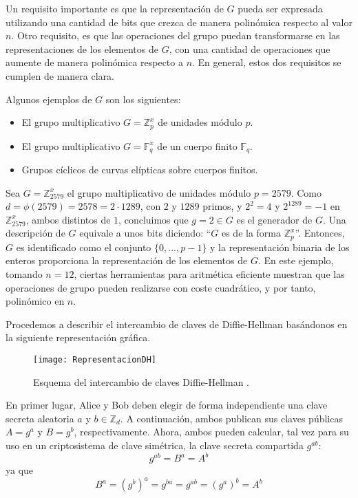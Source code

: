     Un requisito importante es que la representación de $G$ pueda ser expresada utilizando una cantidad de bits que crezca de manera polinómica respecto al valor $n$. Otro requisito, es que las operaciones del grupo puedan transformarse en las representaciones de los elementos de $G$, con una cantidad de operaciones que aumente de manera polinómica respecto a $n$. En general, estos dos requisitos se cumplen de manera clara.

    Algunos ejemplos de $G$ son los siguientes:
    \begin{itemize}
        \item El grupo multiplicativo $G = \mathbb{Z}_{p}^{x}$ de unidades módulo $p$.
        \item El grupo multiplicativo $G = \mathbb{F}_{q}^{x}$ de un cuerpo finito $\mathbb{F}_{q}$.
        \item Grupos cíclicos de curvas elípticas sobre cuerpos finitos.
    \end{itemize}
    
    \begin{ejemplo} \cite{cryptoSchool}
        Sea $G = \mathbb{Z}_{2579}^{x}$ el grupo multiplicativo de unidades módulo $p = 2579$. Como $d = \phi(2579) = 2578 = 2 \cdot 1289$, con $2$ y $1289$ primos, y $2^{2} = 4$ y $2^{1289} = -1$ en $\mathbb{Z}_{2579}^{x}$, ambos distintos de $1$, concluimos que $g = 2 \in G$ es el generador de $G$. Una descripción de $G$ equivale a unos bits diciendo: ``$G$ es de la forma $\mathbb{Z}_{p}^{x}$''. Entonces, $G$ es identificado como el conjunto $\{0, ... , p-1\}$ y la representación binaria de los enteros proporciona la representación de los elementos de $G$. En este ejemplo, tomando $n = 12$, ciertas herramientas para aritmética eficiente muestran que las operaciones de grupo pueden realizarse con coste cuadrático, y por tanto, polinómico en $n$.
    \end{ejemplo}

    Procedemos a describir el intercambio de claves de Diffie-Hellman basándonos en la siguiente representación gráfica.
    
    \begin{figure}[H]
        \centering
        \texttt{[image: RepresentacionDH]}
        \caption{Esquema del intercambio de claves Diffie-Hellman \cite{cryptoSchool}.}
    \end{figure}

    En primer lugar, Alice y Bob deben elegir de forma independiente una clave secreta aleatoria $a$ y $b \in \mathbb{Z}_{d}$. A continuación, ambos publican sus claves públicas $A = g^{a}$ y $B = g^{b}$, respectivamente. Ahora, ambos pueden calcular, tal vez para su uso en un criptosistema de clave simétrica, la clave secreta compartida $g^{ab}$:
    \begin{equation}
        g^{ab} = B^{a} = A^{b}
    \end{equation}
    ya que
    \begin{equation}
        B^{a} = (g^{b})^{a} = g^{ba} = g^{ab} = (g^{a})^{b} = A^{b}
    \end{equation}
    
